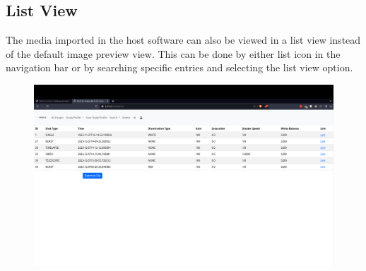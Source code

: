 \documentclass[12pt]{article}
\begin{document}
\begin{center}
	\subsection{List View}
	The media imported in the host software can also be viewed in a list view instead of the default image preview view. This can be done by either list icon in the navigation bar or by searching specific entries and selecting the list view option.
	\begin{figure}[H]
		\includegraphics[width=\textwidth]{Figures/List-View.png}
	\end{figure}

\end{center}
\end{document}
